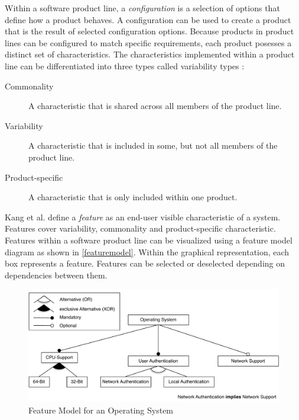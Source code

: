 \documentclass[a4paper]{article}
\begin{document}
Within a software product line, a \emph{configuration} is a selection of options that define how a product behaves. A configuration can be used to create a product that is the result of selected configuration options.
Because products in product lines can be configured to match specific requirements, each product posesses a distinct set of characteristics. The characteristics implemented within a product line can be differentiated into three types called variability types \cite[p.8]{spl-in-action}:
\begin{description}
\item[Commonality]  A characteristic that is shared across all members of the product line.
\item[Variability]  A characteristic that is included in some, but not all members of the product line.
\item[Product-specific]  A characteristic that is only included within one product. 
\end{description}

Kang et al. \cite{KangFeatureOrientedDomain1990} define a \emph{feature} as an end-user visible characteristic of a system. Features cover variability, commonality and product-specific characteristic. Features within a software product line can be visualized using a feature model diagram as shown in \autoref{featuremodel}. Within the graphical representation, each box represents a feature. Features can be selected or deselected depending on dependencies between them.

\begin{figure}[h] 
  \centering
  \begin{minipage}[b]{1\textwidth} 
    \caption[Feature Model]{Feature Model for an Operating System}\label{featuremodel}
    \includegraphics[width=1\textwidth]{img/featuremodel.pdf}
  \end{minipage}
\end{figure}
\end{document}
